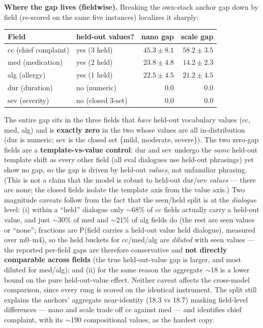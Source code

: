 \documentclass[11pt]{article}
\begin{document}
\textbf{Where the gap lives (fieldwise).} Breaking the own-stack anchor gap down by field (re-scored on the same five instances) localizes it sharply:

 \begin{center}
\begin{tabular}{llrr}
\toprule
Field & held-out values? & nano gap & scale gap \\
\midrule
cc (chief complaint) & yes (3 held) & $45.3\pm8.1$ & $58.2\pm3.5$ \\
med (medication) & yes (2 held) & $23.8\pm4.8$ & $14.2\pm2.3$ \\
alg (allergy) & yes (1 held) & $22.5\pm4.5$ & $21.2\pm4.5$ \\
dur (duration) & no (numeric) & 0.0 & 0.0 \\
sev (severity) & no (closed 3-set) & 0.0 & 0.0 \\
\bottomrule
\end{tabular}
\end{center}

The entire gap sits in the three fields that \emph{have} held-out vocabulary values (cc, med, alg) and is \textbf{exactly zero} in the two whose values are all in-distribution (dur is numeric; sev is the closed set \{mild, moderate, severe\}). The two zero-gap fields are a \textbf{template-vs-value control}: dur and sev undergo the \emph{same} held-out template shift as every other field (all eval dialogues use held-out phrasings) yet show no gap, so the gap is driven by held-out \emph{values}, not unfamiliar phrasing. (This is not a claim that the model is robust to held-out dur/sev \emph{values} --- there are none; the closed fields isolate the template axis from the value axis.) Two magnitude caveats follow from the fact that the seen/held split is at the \emph{dialogue} level: (i) within a ``held'' dialogue only $\sim$68\% of cc fields actually carry a held-out value, and just $\sim$30\% of med and $\sim$21\% of alg fields do (the rest are seen values or ``none''; fractions are P(field carries a held-out value \textbar{} held dialogue), measured over m0--m4), so the held buckets for cc/med/alg are \emph{diluted} with seen values --- the reported per-field gaps are therefore conservative and \textbf{not directly comparable across fields} (the true held-out-value gap is larger, and most diluted for med/alg); and (ii) for the same reason the aggregate $\sim$18 is a lower bound on the pure held-out-value effect. Neither caveat affects the cross-model comparison, since every rung is scored on the identical instrument. The split still explains the anchors' aggregate near-identity (18.3 vs 18.7) masking field-level differences --- nano and scale trade off cc against med --- and identifies chief complaint, with its $\sim$190 compositional values, as the hardest copy.
\end{document}
